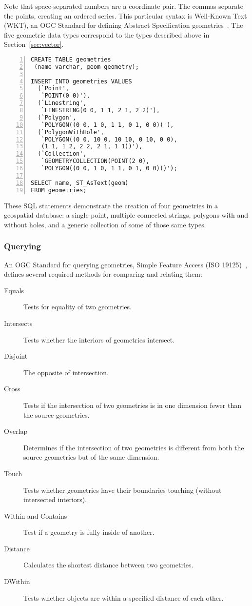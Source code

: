 Note that space-separated numbers are a coordinate pair. The commas separate the points, creating an ordered series. This particular syntax is Well-Known Text (WKT), an OGC Standard for defining Abstract Specification geometries~\cite{ogc}. The five geometric data types correspond to the types described above in Section~\ref{sec:vector}.

\begin{Verbatim}[samepage=true,baselinestretch=1,numbers=left,xleftmargin=12mm]
CREATE TABLE geometries
 (name varchar, geom geometry);

INSERT INTO geometries VALUES
  (`Point',
   `POINT(0 0)'),
  (`Linestring',
   `LINESTRING(0 0, 1 1, 2 1, 2 2)'),
  (`Polygon',
   `POLYGON((0 0, 1 0, 1 1, 0 1, 0 0))'),
  (`PolygonWithHole',
   `POLYGON((0 0, 10 0, 10 10, 0 10, 0 0),
   (1 1, 1 2, 2 2, 2 1, 1 1))'),
  (`Collection',
   `GEOMETRYCOLLECTION(POINT(2 0),
   `POLYGON((0 0, 1 0, 1 1, 0 1, 0 0)))');

SELECT name, ST_AsText(geom)
FROM geometries;
\end{Verbatim}

These SQL statements demonstrate the creation of four geometries in a geospatial database: a single point, multiple connected strings, polygons with and without holes, and a generic collection of some of those same types.

\subsubsection{Querying}
An OGC Standard for querying geometries, Simple Feature Access (ISO 19125)~\cite{}, defines several required methods for comparing and relating them:

\begin{description}
  \item[Equals] Tests for equality of two geometries.
  \item[Intersects] Tests whether the interiors of geometries intersect.
  \item[Disjoint] The opposite of intersection.
  \item[Cross] Tests if the intersection of two geometries is in one dimension fewer than the source geometries.
  \item[Overlap] Determines if the intersection of two geometries is different from both the source geometries but of the same dimension.
  \item[Touch] Tests whether geometries have their boundaries touching (without intersected interiors).
  \item[Within and Contains] Test if a geometry is fully inside of another.
  \item[Distance] Calculates the shortest distance between two geometries.
  \item[DWithin] Tests whether objects are within a specified distance of each other.
\end{description}

